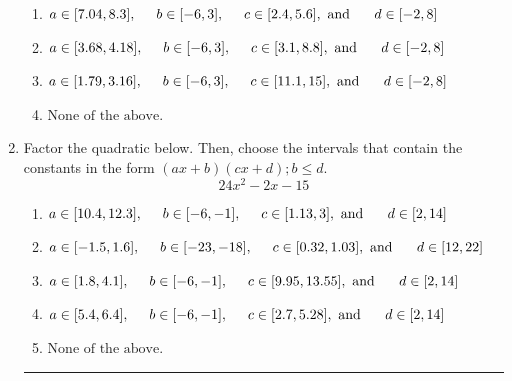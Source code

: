\documentclass[14pt]{extbook}
\newcommand{\litem}[1]{\item#1\hspace*{-1cm}\rule{\textwidth}{0.4pt}}
\begin{document}
\begin{enumerate}
{\begin{enumerate}[label=\Alph*.]
\item \( a \in [7.04, 8.3], \hspace*{5mm} b \in [-6, 3], \hspace*{5mm} c \in [2.4, 5.6], \text{ and } \hspace*{5mm} d \in [-2, 8] \)
\item \( a \in [3.68, 4.18], \hspace*{5mm} b \in [-6, 3], \hspace*{5mm} c \in [3.1, 8.8], \text{ and } \hspace*{5mm} d \in [-2, 8] \)
\item \( a \in [1.79, 3.16], \hspace*{5mm} b \in [-6, 3], \hspace*{5mm} c \in [11.1, 15], \text{ and } \hspace*{5mm} d \in [-2, 8] \)
\item \( \text{None of the above.} \)

\end{enumerate} }
\litem{
Factor the quadratic below. Then, choose the intervals that contain the constants in the form $(ax+b)(cx+d); b \leq d.$\[ 24x^{2} -2 x -15 \]\begin{enumerate}[label=\Alph*.]
\item \( a \in [10.4, 12.3], \hspace*{5mm} b \in [-6, -1], \hspace*{5mm} c \in [1.13, 3], \text{ and } \hspace*{5mm} d \in [2, 14] \)
\item \( a \in [-1.5, 1.6], \hspace*{5mm} b \in [-23, -18], \hspace*{5mm} c \in [0.32, 1.03], \text{ and } \hspace*{5mm} d \in [12, 22] \)
\item \( a \in [1.8, 4.1], \hspace*{5mm} b \in [-6, -1], \hspace*{5mm} c \in [9.95, 13.55], \text{ and } \hspace*{5mm} d \in [2, 14] \)
\item \( a \in [5.4, 6.4], \hspace*{5mm} b \in [-6, -1], \hspace*{5mm} c \in [2.7, 5.28], \text{ and } \hspace*{5mm} d \in [2, 14] \)
\item \( \text{None of the above.} \)


\end{enumerate}}
\end{enumerate}
\end{document}
